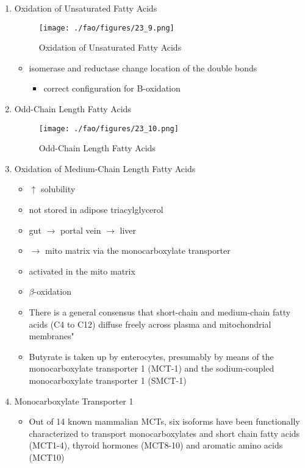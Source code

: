 \documentclass{scrartcl}
\begin{document}
\begin{enumerate}
\item Oxidation of Unsaturated Fatty Acids
\label{sec:org54a9d26}

\begin{figure}[htbp]
\centering
\texttt{[image: ./fao/figures/23\_9.png]}
\caption{\label{fig:org8b71250}
Oxidation of Unsaturated Fatty Acids}
\end{figure}

\begin{itemize}
\item isomerase and reductase change location of the double bonds
\begin{itemize}
\item correct configuration for B-oxidation
\end{itemize}
\end{itemize}
\item Odd-Chain Length Fatty Acids
\label{sec:org5a09574}
\begin{figure}[htbp]
\centering
\texttt{[image: ./fao/figures/23\_10.png]}
\caption{\label{fig:orgc7e65e9}
Odd-Chain Length Fatty Acids}
\end{figure}

\item Oxidation of Medium-Chain Length Fatty Acids
\label{sec:org4307376}

\begin{itemize}
\item \(\uparrow\) solubility
\item not stored in adipose triacylglycerol
\item gut \(\to\) portal vein \(\to\) liver
\item \(\to\) mito matrix via the monocarboxylate transporter
\item activated in the mito matrix
\item \(\beta\)-oxidation

\item There is a general consensus that short-chain and medium-chain fatty
acids (C4 to C12) diffuse freely across plasma and mitochondrial
membranes"
\item Butyrate is taken up by enterocytes, presumably by means of the
monocarboxylate transporter 1 (MCT-1) and the sodium-coupled
monocarboxylate transporter 1 (SMCT-1)
\end{itemize}

\item Monocarboxylate Transporter 1
\label{sec:org58dd5f1}
\begin{itemize}
\item Out of 14 known mammalian MCTs, six isoforms have been functionally
characterized to transport monocarboxylates and short chain fatty
acids (MCT1-4), thyroid hormones (MCT8-10) and aromatic amino
acids (MCT10)


\end{itemize}
\end{enumerate}
\end{document}
